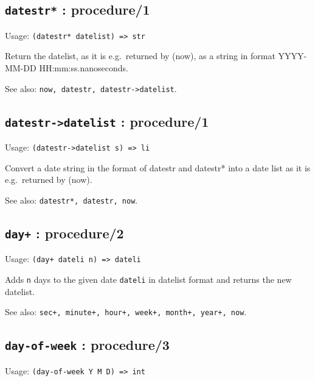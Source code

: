 \documentclass[
]{article}
\newcommand{\passthrough}[1]{#1}
\begin{document}
\hypertarget{datestr-procedure1-3}{%
\subsection{\texorpdfstring{\texttt{datestr*} :
procedure/1}{datestr* : procedure/1}}\label{datestr-procedure1-3}}

Usage: \passthrough{\lstinline!(datestr* datelist) => str!}

Return the datelist, as it is e.g.~returned by (now), as a string in
format YYYY-MM-DD HH:mm:ss.nanoseconds.

See also: \passthrough{\lstinline!now, datestr, datestr->datelist!}.

\hypertarget{datestr-datelist-procedure1-1}{%
\subsection{\texorpdfstring{\texttt{datestr-\textgreater{}datelist} :
procedure/1}{datestr-\textgreater datelist : procedure/1}}\label{datestr-datelist-procedure1-1}}

Usage: \passthrough{\lstinline!(datestr->datelist s) => li!}

Convert a date string in the format of datestr and datestr* into a date
list as it is e.g.~returned by (now).

See also: \passthrough{\lstinline!datestr*, datestr, now!}.

\hypertarget{day-procedure2-1}{%
\subsection{\texorpdfstring{\texttt{day+} :
procedure/2}{day+ : procedure/2}}\label{day-procedure2-1}}

Usage: \passthrough{\lstinline!(day+ dateli n) => dateli!}

Adds \passthrough{\lstinline!n!} days to the given date
\passthrough{\lstinline!dateli!} in datelist format and returns the new
datelist.

See also:
\passthrough{\lstinline!sec+, minute+, hour+, week+, month+, year+, now!}.

\hypertarget{day-of-week-procedure3-1}{%
\subsection{\texorpdfstring{\texttt{day-of-week} :
procedure/3}{day-of-week : procedure/3}}\label{day-of-week-procedure3-1}}

Usage: \passthrough{\lstinline!(day-of-week Y M D) => int!}
\end{document}
